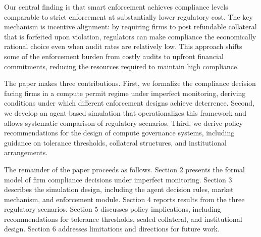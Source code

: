 Our central finding is that smart enforcement achieves compliance levels comparable to strict enforcement at substantially lower regulatory cost. The key mechanism is incentive alignment: by requiring firms to post refundable collateral that is forfeited upon violation, regulators can make compliance the economically rational choice even when audit rates are relatively low. This approach shifts some of the enforcement burden from costly audits to upfront financial commitments, reducing the resources required to maintain high compliance.

The paper makes three contributions. First, we formalize the compliance decision facing firms in a compute permit regime under imperfect monitoring, deriving conditions under which different enforcement designs achieve deterrence. Second, we develop an agent-based simulation that operationalizes this framework and allows systematic comparison of regulatory scenarios. Third, we derive policy recommendations for the design of compute governance systems, including guidance on tolerance thresholds, collateral structures, and institutional arrangements.

The remainder of the paper proceeds as follows. Section 2 presents the formal model of firm compliance decisions under imperfect monitoring. Section 3 describes the simulation design, including the agent decision rules, market mechanism, and enforcement module. Section 4 reports results from the three regulatory scenarios. Section 5 discusses policy implications, including recommendations for tolerance thresholds, scaled collateral, and institutional design. Section 6 addresses limitations and directions for future work. 



